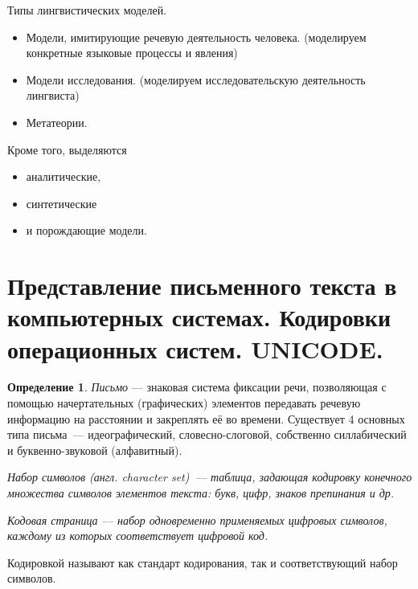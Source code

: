 \documentclass[12pt]{article}
\theoremstyle{definition}
\newtheorem*{defn}{Определение}
\theoremstyle{remark}
\numberwithin{equation}{section}
\begin{document}
Типы лингвистических моделей.
\begin{itemize}
	\item Модели, имитирующие речевую деятельность человека. (моделируем конкретные языковые процессы и явления)
	\item Модели исследования. (моделируем исследовательскую деятельность лингвиста)
	\item Метатеории.
\end{itemize}

Кроме того, выделяются
\begin{itemize}
	\item аналитические,
	\item синтетические
	\item и порождающие модели.
\end{itemize}

\section{Представление письменного текста в компьютерных системах. Кодировки операционных систем. UNICODE.}
\begin{defn}
\textit{Письмо} --- знаковая система фиксации речи, позволяющая с помощью начертательных (графических) элементов передавать речевую информацию на расстоянии и закреплять её во времени. Существует 4 основных типа письма~--- идеографический, словесно-слоговой, собственно силлабический и буквенно-звуковой (алфавитный).

\it{Набор символов (англ. character set)}~--– таблица, задающая кодировку конечного множества символов элементов текста: букв, цифр, знаков препинания и др.

\it{Кодовая страница} --– набор одновременно применяемых цифровых символов, каждому из которых соответствует цифровой код.
\end{defn}
Кодировкой называют как стандарт кодирования, так и соответствующий набор символов.
\end{document}

